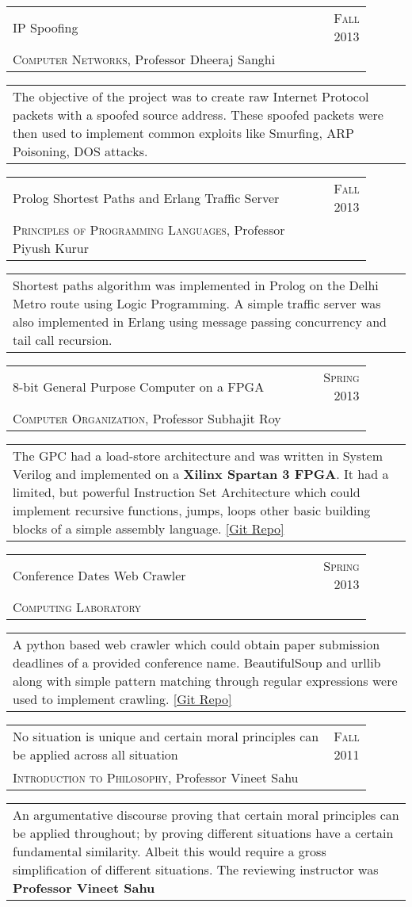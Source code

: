 \documentclass[a4paper,10pt]{article} %
\newcommand{\project}[4]{
    \begin{tabular}{p{0.9\linewidth}r}
        \textcolor{NavyBlue}{#2} & \textsc{#1}\\
        #3
    \end{tabular}
    \begin{tabular}{p{\linewidth}}
        \footnotesize{#4}
    \end{tabular}
    \vspace{-0.1cm}
}
\begin{document}
\project {Fall 2013}
         {IP Spoofing}
         {\textsc{Computer Networks}, Professor Dheeraj Sanghi}
         {The objective of the project was to create raw Internet Protocol packets with a spoofed source
          address. These spoofed packets were then used to implement common exploits like Smurfing,
          ARP Poisoning, DOS attacks.}

\project {Fall 2013}
         {Prolog Shortest Paths and Erlang Traffic Server}
         {\textsc{Principles of Programming Languages}, Professor Piyush Kurur}
         {Shortest paths algorithm was implemented in Prolog on the Delhi Metro route
          using Logic Programming. A simple traffic server was also implemented in Erlang
          using message passing concurrency and tail call recursion.}

\project {Spring 2013}
         {8-bit General Purpose Computer on a FPGA}
         {\textsc{Computer Organization}, Professor Subhajit Roy}
         {The GPC had a load-store architecture and was written in System Verilog and
          implemented on a \textbf{Xilinx Spartan 3 FPGA}. It had a limited, but powerful
          Instruction Set Architecture which could implement recursive functions, jumps,
          loops  other basic building blocks of a simple assembly language.
          \href{https://github.com/srijanshetty/220_y11} {[Git Repo]}}

\project {Spring 2013}
         {Conference Dates Web Crawler}
         {\textsc{Computing Laboratory}}
         {A python based web crawler which could obtain paper submission
          deadlines of a provided conference name.  BeautifulSoup and urllib along
          with simple pattern matching through regular expressions were used to implement crawling.
          \href{https://github.com/srijanshetty/crawler} {[Git Repo]}}

\project {Fall 2011}
         {No situation is unique and certain moral principles can be applied across all situation}
         {\textsc{Introduction to Philosophy}, Professor Vineet Sahu}
         {An argumentative discourse proving that certain moral principles
          can be applied throughout; by proving different situations have a certain
          fundamental similarity.  Albeit this would require a gross simplification of
          different situations.  The reviewing instructor was \textbf{Professor Vineet Sahu}}

\end{document}

